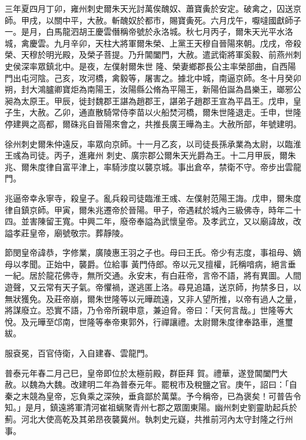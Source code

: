 \begin{pinyinscope}
 三年夏四月丁卯，雍州刺史爾朱天光討萬俟醜奴、蕭寶夤於安定。破禽之，囚送京師。甲戌，以關中平，大赦。斬醜奴於都市，賜寶夤死。六月戊午，嚈噠國獻師子一。是月，白馬龍泗胡王慶雲僭稱帝號於永洛城。秋七月丙子，爾朱天光平水洛城，禽慶雲。九月辛卯，天柱大將軍爾朱榮、上黨王天穆自晉陽來朝。戊戌，帝殺榮、天穆於明光殿，及榮子菩提。乃升閶闔門，大赦。遣武衛將軍奚毅、前燕州刺史侯深率眾鎮北中。是夜，左僕射爾朱世
 隆、榮妻鄉郡長公主率榮部曲，自西陽門出屯河陰。己亥，攻河橋，禽毅等，屠害之。據北中城，南逼京師。冬十月癸卯朔，封大鴻臚卿寶炬為南陽王，汝陽縣公脩為平陽王，新陽伯誕為昌樂王，瑯邪公昶為太原王。甲辰，徙封魏郡王諶為趙郡王，諶弟子趙郡王宣為平昌王。戊申，皇子生，大赦。乙卯，通直散騎常侍李苗以火船焚河橋，爾朱世隆退走。壬申，世隆停建興之高都，爾硃兆自晉陽來會之，共推長廣王曄為主。大赦所部，年號建明。



 徐州刺史爾朱仲遠反，率眾向京師。十一月乙亥，以司徒長孫承業為太尉，以臨淮王彧為司徒。丙子，進雍州
 刺史、廣宗郡公爾朱天光爵為王。十二月甲辰，爾朱兆、爾朱度律自富平津上，率騎涉度以襲京城。事出倉卒，禁衛不守。帝步出雲龍門。



 兆逼帝幸永寧寺，殺皇子。亂兵殺司徒臨淮王彧、左僕射范陽王誨。戊申，爾朱度律自鎮京師。甲寅，爾朱兆遷帝於晉陽。甲子，帝遇弒於城內三級佛寺，時年二十四。並害陳留王寬。中興二年，廢帝奉謚為武懷皇帝。及孝武立，又以廟諱故，改謚孝莊皇帝，廟號敬宗。葬靜陵。



 節閔皇帝諱恭，字修業，廣陵惠王羽之子也。母曰王氏。帝少有志度，事祖母、嫡母以孝聞。正始中，襲爵。位給事
 黃門侍郎。帝以元叉擅權，託稱喑病，絕言垂一紀。居於龍花佛寺，無所交通。永安末，有白莊帝，言帝不語，將有異圖。人間遊聲，又云常有天子氣。帝懼禍，遂逃匿上洛。尋見追躡，送京師，拘禁多日，以無狀獲免。及莊帝崩，爾朱世隆等以元曄疏遠，又非人望所推，以帝有過人之量，將謀廢立。恐實不語，乃令帝所親申意，兼迫脅。帝曰：「天何言哉。」世隆等大悅。及元曄至邙南，世隆等奉帝東郭外，行禪讓禮。太尉爾朱度律奉路車，進璽紱。



 服袞冕，百官侍衛，入自建春、雲龍門。



 普泰元年春二月己巳，皇帝即位於太極前殿，群臣拜
 賀。禮華，遂登閶闔門大赦。以魏為大魏。改建明二年為普泰元年。罷稅市及稅鹽之官。庚午，詔曰：「自秦之末競為皇帝，忘負乘之深殃，垂貪鄙於萬葉。予今稱帝，已為褒矣！可普告令知。」是月，鎮遠將軍清河崔祖螭聚青州七郡之眾圍東陽。幽州刺史劉靈助起兵於薊。河北大使高乾及其弟昂夜襲冀州。執刺史元嶷，共推前河內太守封隆之行州事。




\end{pinyinscope}
